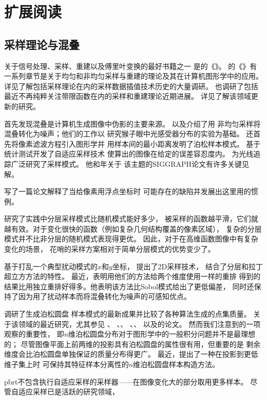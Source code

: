 \section{扩展阅读}\label{sec:扩展阅读07}
\subsection{采样理论与混叠}\label{sub:采样理论与混叠}
关于信号处理、采样、重建以及傅里叶变换的最好书籍之一
是\citeauthor{91250711}的《》\parencite*{91250711}。
\citeauthor{GLASSNER1995}的《》\parencite*{GLASSNER1995}有
一系列章节是关于均匀和非均匀采样与重建的理论及其在计算机图形学中的应用。
详见\citet{993400}了解包括采样理论在内的采样数据插值技术历史的大量调研。
\citet{843002}也调研了包括最近不再纯粹关注带限函数在内的采样和重建理论近期进展。
详见\citet{4815542}了解该领域更新的研究。

\citet{10.1145/359863.359869}首先发现混叠是计算机生成图像中伪影的主要来源。
\citet{10.1145/7529.8927}以及\citet{10.1145/325334.325182}介绍了用
非均匀采样将混叠转化为噪声；他们的工作以\citet{10.1126/science.6867716}
研究猴子眼中光感受器分布的实验为基础。
\citeauthor{10.1145/325334.325182}还首先将像素滤波方程引入图形学并
用样本间的最小距离发明了泊松样本模式。
\citet{10.1145/325334.325179}基于统计测试开发了自适应采样技术
使算出的图像在给定的误差容忍度内。
\citeauthor{10.1145/37401.37410}为光线追踪广泛研究了采样模式。
他\cite*{10.1145/37401.37410}和\cite*{10.1145/122718.122736}年关于
该主题的SIGGRAPH论文有许多关键见解。

\citet{HECKBERT1990246}写了一篇论文解释了当给像素用浮点坐标时
可能存在的缺陷并发展出这里用的惯例。

\citet{10.1145/237170.237265}研究了实践中分层采样模式比随机模式能好多少，
被采样的函数越平滑，它们就越有效。对于变化很快的函数（例如复杂几何结构覆盖的像素区域），
复杂的分层模式并不比非分层的随机模式表现得更优。
因此，对于在高维函数图像中有复杂变化的场景，
花哨的采样方案相对于简单分层模式的优势变少了。

\citet{CHIU1994370}基于打乱一个典型扰动模式的$x$和$y$坐标，
提出了2D采样技术，
结合了分层和拉丁超立方方法的特性。
最近，\citet{Kensler2013Pixar}表明用他们的方法给两个维度使用一样的重排
得到的结果比用独立重排好得多。他表明该方法比Sobol模式给出了更低偏差，
同时还保持了因为用了扰动样本而将混叠转化为噪声的可感知优点。

\citet{10.1111/j.1467-8659.2007.01100.x}调研了生成泊松圆盘
样本模式的最新成果并比较了各种算法生成的点集质量。
关于该领域的最近研究，尤其参见\citet{10.1080/2151237X.2006.10129217}
、
\citet{10.1145/1179352.1141915}、\citet{10.1145/1399504.1360619}、
\citet{10.1145/1866158.1866189}、\citet{10.1145/1964921.1964944}、
以及\citet{10.1111/j.1467-8659.2012.03059.x}的论文。
然而我们注意到\citet{10.1145/122718.122736}的一项观察的重要性，
即$n$维泊松圆盘分布对于图形学中的一般积分问题并不是最理想的；
尽管图像平面上前两维的投影具有泊松圆盘的属性很有用，但重要的是
剩余维度会比泊松圆盘单独保证的质量分布得更广。
最近，\citet{10.1111/cgf.12725}提出了一种在投影到更低维子集上时
可保持其特征样本分离性的$n$维泊松圆盘样本构造方法。

pbrt不包含执行自适应采样的采样器——在图像变化大的部分取用更多样本。
尽管自适应采样已是活跃的研究领域，